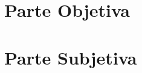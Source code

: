 \documentclass[11pt,twoside,a4paper]{book}
\renewcommand{\chaptermark}[1]{\markboth{\MakeUppercase{#1}}{}}
\begin{document}
\listoffigures            
\listoftables            

\mainmatter

\fancyhead[RE,LO]{\thesection}

\singlespacing              %

\part{Parte Objetiva}


\part{Parte Subjetiva}




\backmatter \singlespacing   %


\end{document}
